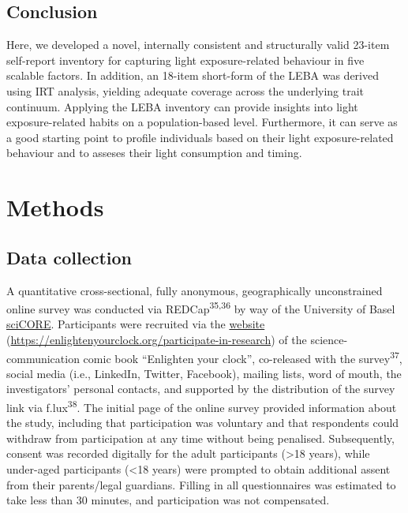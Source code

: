 \documentclass[
  man]{apa6}
\begin{document}
\hypertarget{conclusion}{%
\subsection{Conclusion}\label{conclusion}}

Here, we developed a novel, internally consistent and structurally valid 23-item self-report inventory for capturing light exposure-related behaviour in five scalable factors. In addition, an 18-item short-form of the LEBA was derived using IRT analysis, yielding adequate coverage across the underlying trait continuum. Applying the LEBA inventory can provide insights into light exposure-related habits on a population-based level. Furthermore, it can serve as a good starting point to profile individuals based on their light exposure-related behaviour and to asseses their light consumption and timing.

\hypertarget{methods}{%
\section{Methods}\label{methods}}

\hypertarget{data-collection}{%
\subsection{Data collection}\label{data-collection}}

A quantitative cross-sectional, fully anonymous, geographically unconstrained online survey was conducted via REDCap\textsuperscript{35,36} by way of the University of Basel \href{https://redcap.scicore.unibas.ch}{sciCORE}. Participants were recruited via the \href{https://enlightenyourclock.org/participate-in-research}{website} (\url{https://enlightenyourclock.org/participate-in-research}) of the science-communication comic book ``Enlighten your clock'', co-released with the survey\textsuperscript{37}, social media (i.e., LinkedIn, Twitter, Facebook), mailing lists, word of mouth, the investigators' personal contacts, and supported by the distribution of the survey link via f.lux\textsuperscript{38}. The initial page of the online survey provided information about the study, including that participation was voluntary and that respondents could withdraw from participation at any time without being penalised. Subsequently, consent was recorded digitally for the adult participants (\textgreater18 years), while under-aged participants (\textless18 years) were prompted to obtain additional assent from their parents/legal guardians. Filling in all questionnaires was estimated to take less than 30 minutes, and participation was not compensated.
\end{document}
